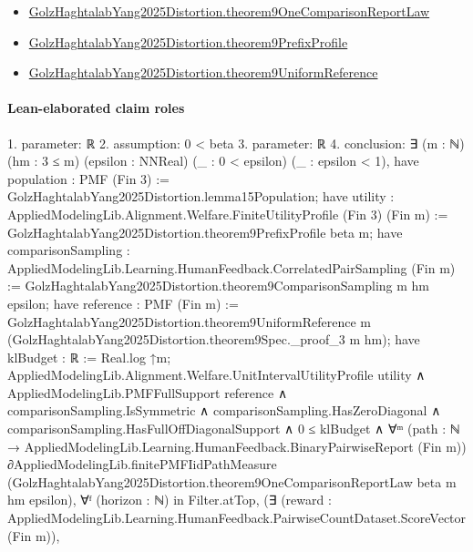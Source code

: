 \documentclass[10pt]{article}
\begin{document}
\begin{itemize}
\item \hyperlink{governing-declaration-e63d2c356e95b6b5}{Golz\allowbreak{}Haghtalab\allowbreak{}Yang2025\allowbreak{}Distortion.\allowbreak{}theorem9\allowbreak{}One\allowbreak{}Comparison\allowbreak{}Report\allowbreak{}Law}
\item \hyperlink{governing-declaration-a2115bb0ddee2a78}{Golz\allowbreak{}Haghtalab\allowbreak{}Yang2025\allowbreak{}Distortion.\allowbreak{}theorem9\allowbreak{}Prefix\allowbreak{}Profile}
\item \hyperlink{governing-declaration-35b3f5ca150bffc2}{Golz\allowbreak{}Haghtalab\allowbreak{}Yang2025\allowbreak{}Distortion.\allowbreak{}theorem9\allowbreak{}Uniform\allowbreak{}Reference}
\end{itemize}
\paragraph{Lean-elaborated claim roles}\begin{ReviewVerbatim}
1. parameter: ℝ
2. assumption: 0 < beta
3. parameter: ℝ
4. conclusion: ∃ (m : ℕ) (hm : 3 ≤ m) (epsilon : NNReal) (_ : 0 < epsilon) (_ : epsilon < 1),
  have population : PMF (Fin 3) := GolzHaghtalabYang2025Distortion.lemma15Population;
  have utility : AppliedModelingLib.Alignment.Welfare.FiniteUtilityProfile (Fin 3) (Fin m) :=
    GolzHaghtalabYang2025Distortion.theorem9PrefixProfile beta m;
  have comparisonSampling : AppliedModelingLib.Learning.HumanFeedback.CorrelatedPairSampling (Fin m) :=
    GolzHaghtalabYang2025Distortion.theorem9ComparisonSampling m hm epsilon;
  have reference : PMF (Fin m) :=
    GolzHaghtalabYang2025Distortion.theorem9UniformReference m
      (GolzHaghtalabYang2025Distortion.theorem9Spec._proof_3 m hm);
  have klBudget : ℝ := Real.log ↑m;
  AppliedModelingLib.Alignment.Welfare.UnitIntervalUtilityProfile utility ∧
    AppliedModelingLib.PMFFullSupport reference ∧
      comparisonSampling.IsSymmetric ∧
        comparisonSampling.HasZeroDiagonal ∧
          comparisonSampling.HasFullOffDiagonalSupport ∧
            0 ≤ klBudget ∧
              ∀ᵐ (path :
                ℕ →
                  AppliedModelingLib.Learning.HumanFeedback.BinaryPairwiseReport
                    (Fin
                      m)) ∂AppliedModelingLib.finitePMFIidPathMeasure
                  (GolzHaghtalabYang2025Distortion.theorem9OneComparisonReportLaw beta m hm epsilon),
                ∀ᶠ (horizon : ℕ) in Filter.atTop,
                  (∃ (reward : AppliedModelingLib.Learning.HumanFeedback.PairwiseCountDataset.ScoreVector (Fin m)),

\end{ReviewVerbatim}
\end{document}
